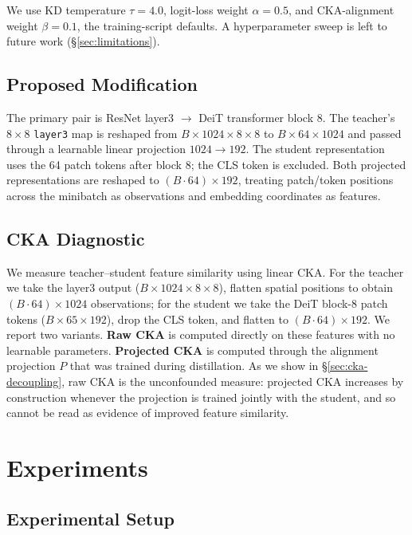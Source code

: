 \documentclass[11pt, letterpaper]{article}
\begin{document}
We use KD temperature $\tau = 4.0$, logit-loss weight $\alpha = 0.5$, and
CKA-alignment weight $\beta = 0.1$, the training-script defaults. A
hyperparameter sweep is left to future work (\S\ref{sec:limitations}).

\subsection{Proposed Modification}

The primary pair is
ResNet layer3 $\rightarrow$ DeiT transformer block 8. The teacher's
$8\times8$ \texttt{layer3} map is reshaped from
$B\times1024\times8\times8$ to $B\times64\times1024$ and passed through a
learnable linear projection $1024\to192$. The student representation uses
the 64 patch tokens after block 8; the CLS token is excluded. Both projected
representations are reshaped to $(B\cdot64)\times192$, treating patch/token
positions across the minibatch as observations and embedding coordinates as
features.

\subsection{CKA Diagnostic}

We measure teacher--student feature similarity using linear CKA. For the
teacher we take the layer3 output ($B\times1024\times8\times8$), flatten
spatial positions to obtain $(B\cdot64)\times1024$ observations; for the
student we take the DeiT block-8 patch tokens ($B\times65\times192$), drop
the CLS token, and flatten to $(B\cdot64)\times192$. We report two variants.
\textbf{Raw CKA} is computed directly on these features with no learnable
parameters. \textbf{Projected CKA} is computed through the alignment
projection $P$ that was trained during distillation. As we show in
\S\ref{sec:cka-decoupling}, raw CKA is the unconfounded measure: projected
CKA increases by construction whenever the projection is trained jointly
with the student, and so cannot be read as evidence of improved feature
similarity.

\section{Experiments}

\subsection{Experimental Setup}
\end{document}
